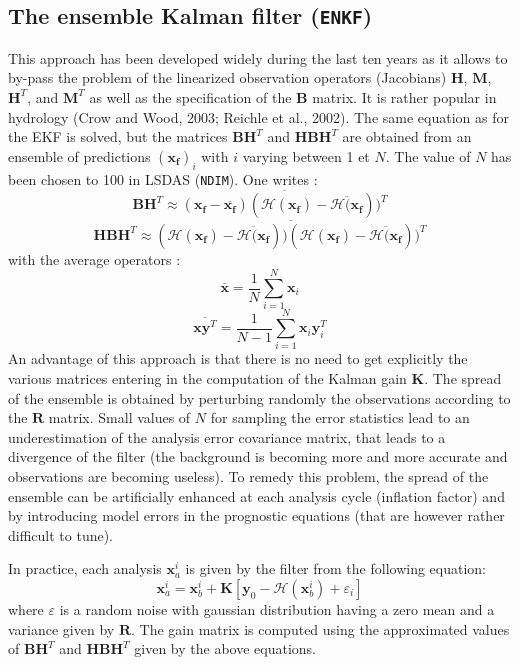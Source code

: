 \documentclass[12pt]{article}
\begin{document}
\subsection{The ensemble Kalman filter ({\tt ENKF})}
This approach has been developed widely during the last ten years
as it allows to by-pass the problem of the linearized observation
operators (Jacobians)
 $\mathbf{H}$, $\mathbf{M}$, $\mathbf{H}^T$, and
$\mathbf{M}^T$ 
as well as the specification of the 
$\mathbf{B}$ matrix. It is rather popular in hydrology (Crow and Wood, 2003; Reichle et al., 2002).
The same equation as for the EKF is solved, but the matrices
  $\mathbf{BH}^T$ and 
$\mathbf{HBH}^T$  are  obtained from an ensemble of predictions
$(\mathbf{x_f})_i$ with $i$ varying between 1 et $N$. The value of $N$
has been chosen to 100 in LSDAS ({\tt NDIM}). One writes :
\[
\mathbf{BH}^T  \approx 
\overline{(\mathbf{x_f}-\overline{\mathbf{x_f}})
(\mathcal{H}(\mathbf{x_f}) - \overline{\mathcal{H}(\mathbf{x_f}}))^T}
\]
\[
\mathbf{HBH}^T  \approx 
\overline{(\mathcal{H}(\mathbf{x_f})-\overline{\mathcal{H}(\mathbf{x_f}}))
(\mathcal{H}(\mathbf{x_f}) - \overline{\mathcal{H}(\mathbf{x_f}}))^T}
\]
with the average operators : 
\[
\overline{\mathbf{x}}= \frac{1}{N}\sum_{i=1}^N \mathbf{x}_i
\]
\[
\overline{\mathbf{x}\mathbf{y}^T}= \frac{1}{N-1} \sum_{i=1}^N
\mathbf{x}_i
\mathbf{y}^T_i
\]
An advantage of this approach is that there is no need to get explicitly
the various matrices entering in the computation of the Kalman gain 
$\mathbf{K}$. 
The spread of the ensemble is obtained by perturbing randomly the observations
according to the $\mathbf{R}$ matrix. Small values of $N$ for sampling the
error statistics lead to an underestimation of the analysis error
covariance matrix, that leads to a divergence of the filter (the background
is becoming more and more accurate and observations are becoming useless).
To remedy this problem, the spread of the ensemble can be artificially enhanced
at each analysis cycle (inflation factor) and by introducing model errors in
the prognostic equations (that are however rather difficult to tune).
\par
In practice, each analysis $\mathbf{x}_a^i$  is given by the filter from
the following equation:
\[
\mathbf{x}_a^{i} = \mathbf{x}_b^{i} + \mathbf{K}[
\mathbf{y}_0 - \mathcal{H}(\mathbf{x}_b^i) + \varepsilon_i] 
\]
where $\varepsilon$ is a random noise with gaussian distribution having a zero mean
and a variance given by $\mathbf{R}$. The gain matrix is computed using
the approximated values of $\mathbf{BH}^T$ and $\mathbf{HBH}^T$ given by the above equations.
\end{document}

